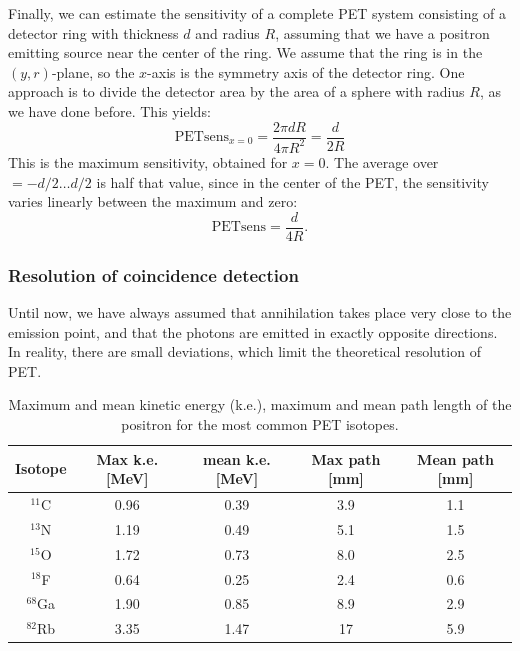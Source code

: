 Finally, we can estimate the sensitivity of a complete PET system consisting
of a detector ring with thickness $d$ and radius $R$, assuming that we have a
positron emitting source near the center of the ring. We assume that the ring
is in the $(y,r)$-plane, so the $x$-axis is the symmetry axis of the detector
ring.  One approach is to divide the detector area by the area of a sphere
with radius $R$, as we have done before. This yields:
\begin{equation}
  \mbox{PETsens}_{x=0} = \frac{2 \pi d R}{ 4 \pi R^2} = \frac{d}{2R}
\end{equation}
This is the maximum sensitivity, obtained for $x = 0$. The average over $ =
-d/2 \ldots d/2$ is half that value, since in the center of the PET, the
sensitivity varies linearly between the maximum and zero:
\begin{equation}
  \mbox{PETsens} = \frac{d}{4R}. \label{eq:petsens}
\end{equation}

\subsubsection{Resolution of coincidence detection}
Until now, we have always assumed that annihilation takes place very close to
the emission point, and that the photons are emitted in exactly opposite
directions. In reality, there are small deviations, which limit the
theoretical resolution of PET. 

\begin{table}
\caption{Maximum and mean kinetic energy (k.e.), maximum and mean path length
of the positron for the most common PET isotopes.
\label{tab:positron_length}}
\begin{center}
\begin{tabular}{|c|c|c|c|c|}
\hline
Isotope   & Max k.e. [MeV] & mean k.e. [MeV] & Max path [mm] & Mean path [mm]\\
\hline
$^{11}$C  & 0.96 & 0.39 & 3.9    & 1.1 \\
$^{13}$N  & 1.19 & 0.49 & 5.1    & 1.5 \\
$^{15}$O  & 1.72 & 0.73 & 8.0    & 2.5 \\
$^{18}$F  & 0.64 & 0.25 & 2.4    & 0.6 \\
$^{68}$Ga & 1.90 & 0.85 & 8.9    & 2.9 \\
$^{82}$Rb & 3.35 & 1.47 & 17     & 5.9 \\
\hline
\end{tabular}
\end{center}
\end{table}

